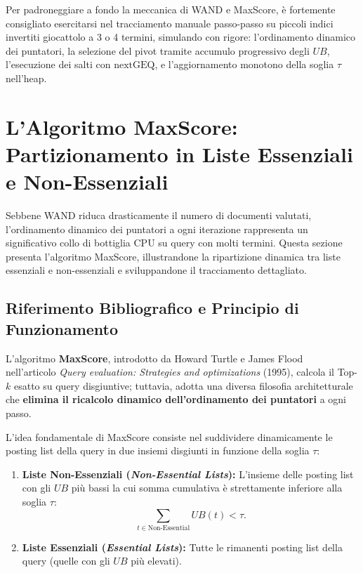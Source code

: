 \begin{remark}
Per padroneggiare a fondo la meccanica di WAND e MaxScore, \`e fortemente consigliato esercitarsi nel tracciamento manuale passo-passo su piccoli indici invertiti giocattolo a 3 o 4 termini, simulando con rigore: l'ordinamento dinamico dei puntatori, la selezione del pivot tramite accumulo progressivo degli $UB$, l'esecuzione dei salti con $\text{nextGEQ}$, e l'aggiornamento monotono della soglia $\tau$ nell'heap.
\end{remark}

\FloatBarrier
\section{L'Algoritmo MaxScore: Partizionamento in Liste Essenziali e Non-Essenziali}
\label{sec:algoritmo-maxscore}

Sebbene WAND riduca drasticamente il numero di documenti valutati, l'ordinamento dinamico dei puntatori a ogni iterazione rappresenta un significativo collo di bottiglia CPU su query con molti termini. Questa sezione presenta l'algoritmo MaxScore, illustrandone la ripartizione dinamica tra liste essenziali e non-essenziali e sviluppandone il tracciamento dettagliato.

\FloatBarrier
\subsection{Riferimento Bibliografico e Principio di Funzionamento}
\label{subsec:maxscore-riferimento-principio}
L'algoritmo \textbf{MaxScore}, introdotto da Howard Turtle e James Flood~\cite{turtle1995} nell'articolo \textit{Query evaluation: Strategies and optimizations} (1995), calcola il Top-$k$ esatto su query disgiuntive; tuttavia, adotta una diversa filosofia architetturale che \textbf{elimina il ricalcolo dinamico dell'ordinamento dei puntatori} a ogni passo.

L'idea fondamentale di MaxScore consiste nel suddividere dinamicamente le posting list della query in due insiemi disgiunti in funzione della soglia $\tau$:
\begin{enumerate}
    \item \textbf{Liste Non-Essenziali (\textit{Non-Essential Lists}):} L'insieme delle posting list con gli $UB$ pi\`u bassi la cui somma cumulativa \`e strettamente inferiore alla soglia $\tau$:
    \begin{equation}
        \sum_{t \in \text{Non-Essential}} UB(t) < \tau.
        \label{eq:maxscore-non-essential}
    \end{equation}
    \item \textbf{Liste Essenziali (\textit{Essential Lists}):} Tutte le rimanenti posting list della query (quelle con gli $UB$ pi\`u elevati).
\end{enumerate}

